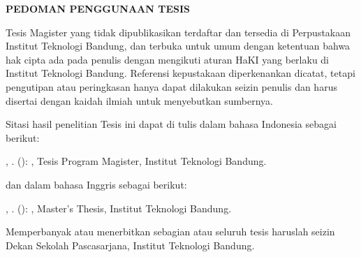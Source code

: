 \clearpage
{}
\begin{center}
  \textbf{\large \MakeUppercase{Pedoman Penggunaan Tesis}} \\[2em]
\end{center}

Tesis Magister yang tidak dipublikasikan terdaftar dan tersedia di Perpustakaan Institut Teknologi Bandung, dan terbuka untuk umum dengan ketentuan bahwa hak cipta ada pada penulis dengan mengikuti aturan HaKI yang berlaku di Institut Teknologi Bandung. Referensi kepustakaan diperkenankan dicatat, tetapi pengutipan atau peringkasan hanya dapat dilakukan seizin penulis dan harus disertai dengan kaidah ilmiah untuk menyebutkan sumbernya.

Sitasi hasil penelitian Tesis ini dapat di tulis dalam bahasa Indonesia sebagai berikut:

\begin{hangparas}{0.5in}{1}
    \AuthorLastName, \AuthorFirstName. (\ThesisYear): \emph{\Title}, Tesis Program Magister, Institut Teknologi Bandung.
\end{hangparas}

dan dalam bahasa Inggris sebagai berikut:\\

\begin{hangparas}{0.5in}{1}
    \AuthorLastName, \AuthorFirstName. (\ThesisYear): \emph{\TitleEnglish}, Master’s Thesis, Institut Teknologi Bandung.
\end{hangparas}

Memperbanyak atau menerbitkan sebagian atau seluruh tesis haruslah seizin Dekan Sekolah Pascasarjana, Institut Teknologi Bandung.
